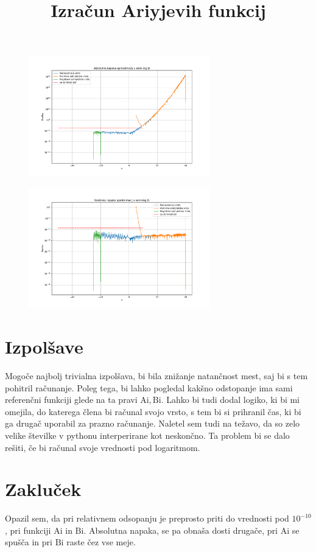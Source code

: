 \documentclass{article}
\newcommand{\Ai}{\mathrm{Ai}}
\newcommand{\Bi}{\mathrm{Bi}}
\theoremstyle{definition}
\theoremstyle{plain}
\numberwithin{definition}{section}
\numberwithin{theorem}{section} \title{Izračun Ariyjevih funkcij}
\begin{document}
\begin{figure}[ht]
	\begin{center}
		\includegraphics[width=0.7\textwidth]{bi_abs.pdf}
	\end{center}
\end{figure}

\begin{figure}[ht]
	\begin{center}
		\includegraphics[width=0.7\textwidth]{bi_rel.pdf}
	\end{center}
\end{figure}

\newpage
\section{Izpolšave}
Mogoče najbolj trivialna izpolšava, bi bila znižanje 
natančnost mest, saj bi s tem pohitril računanje. Poleg tega, bi lahko pogledal
kakšno odstopanje ima sami referenčni funkciji glede na ta pravi $\Ai, \Bi$. Lahko bi tudi dodal logiko, ki bi 
mi omejila, do katerega člena bi računal svojo vrsto, s tem bi si prihranil čas, ki bi ga drugač uporabil za
prazno računanje. Naletel sem tudi na težavo, da so zelo velike številke v pythonu interperirane kot neskončno.
Ta problem bi se dalo rešiti, če bi računal svoje vrednosti pod logaritmom.

\section{Zakluček}
Opazil sem, da pri relativnem odsopanju je preprosto priti do vrednosti pod $10^{-10}$, pri funkciji $\Ai$ in $\Bi$.
Absolutna napaka, se pa obnaša dosti drugače, pri $\Ai$ se spušča in pri $\Bi$ raste čez vse meje.
\end{document}
